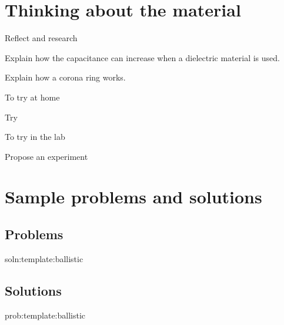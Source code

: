 \newpage
\section{Thinking about the material}

\begin{chapteractivity}{Reflect and research}
{
\item Explain how the capacitance can increase when a dielectric material is used.
\item Explain how a corona ring works.
}
\end{chapteractivity}

\begin{chapteractivity}{To try at home}
{
\item Try
}
\end{chapteractivity}

\begin{chapteractivity}{To try in the lab}
{
\item Propose an experiment
}
\end{chapteractivity}

\newpage
\section{Sample problems and solutions}
\subsection{Problems}
\begin{problem}{soln:template:ballistic}{\label{prob:template:ballistic} 

}
\end{problem}

\newpage
\subsection{Solutions}
\begin{solution}{prob:template:ballistic}\label{soln:template:ballistic}

\end{solution}

